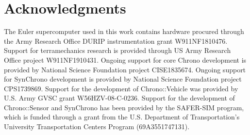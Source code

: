 \documentclass[12pt,twocolumn]{article}
\newcommand{\chrono}{Chrono}
\newcommand{\chronomod}[1]{\chrono{}::#1}
\newcommand{\synchrono}{Syn\chrono{}}
\begin{document}

\section*{Acknowledgments}
The Euler supercomputer used in this work contains hardware procured through the Army Research Office DURIP instrumentation grant W911NF1810476. Support for terramechanics research is provided through US Army Research Office project W911NF1910431. Ongoing support for core {\chrono} development is provided by National Science Foundation project CISE1835674. Ongoing support for SynChrono development is provided by National Science Foundation project CPS1739869. Support for the development of \chronomod{Vehicle} was provided by U.S. Army GVSC grant W56HZV-08-C-0236. Support for the development of \chronomod{Sensor} and {\synchrono} has been provided by the SAFER-SIM program, which is funded through a grant from the U.S. Department of Transportation's University Transportation Centers Program (69A3551747131).



\printbibliography



%
\end{document}
